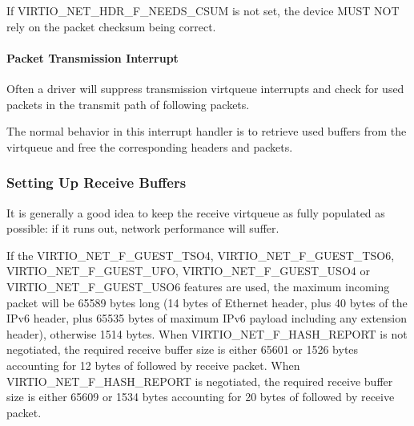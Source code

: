 If VIRTIO_NET_HDR_F_NEEDS_CSUM is not set, the device MUST NOT
rely on the packet checksum being correct.
\paragraph{Packet Transmission Interrupt}\label{sec:Device Types / Network Device / Device Operation / Packet Transmission / Packet Transmission Interrupt}

Often a driver will suppress transmission virtqueue interrupts
and check for used packets in the transmit path of following
packets.

The normal behavior in this interrupt handler is to retrieve
used buffers from the virtqueue and free the corresponding
headers and packets.

\subsubsection{Setting Up Receive Buffers}\label{sec:Device Types / Network Device / Device Operation / Setting Up Receive Buffers}

It is generally a good idea to keep the receive virtqueue as
fully populated as possible: if it runs out, network performance
will suffer.

If the VIRTIO_NET_F_GUEST_TSO4, VIRTIO_NET_F_GUEST_TSO6,
VIRTIO_NET_F_GUEST_UFO, VIRTIO_NET_F_GUEST_USO4 or VIRTIO_NET_F_GUEST_USO6
features are used, the maximum incoming packet
will be 65589 bytes long (14 bytes of Ethernet header, plus 40 bytes of
the IPv6 header, plus 65535 bytes of maximum IPv6 payload including any
extension header), otherwise 1514 bytes.
When VIRTIO_NET_F_HASH_REPORT is not negotiated, the required receive buffer
size is either 65601 or 1526 bytes accounting for 12 bytes of
 followed by receive packet.
When VIRTIO_NET_F_HASH_REPORT is negotiated, the required receive buffer
size is either 65609 or 1534 bytes accounting for 20 bytes of
 followed by receive packet.



